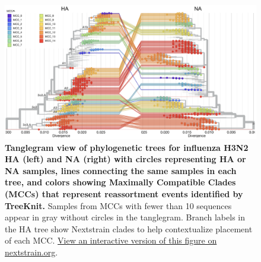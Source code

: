 \begin{figure}[!h]
\includegraphics[width=\columnwidth]{figures/flu-2016-2018-ha-na-tangletree-by-mcc.png}
\caption{{\bf Tanglegram view of phylogenetic trees for influenza H3N2 HA (left) and NA (right) with circles representing HA or NA samples, lines connecting the same samples in each tree, and colors showing Maximally Compatible Clades (MCCs) that represent reassortment events identified by TreeKnit.}
  Samples from MCCs with fewer than 10 sequences appear in gray without circles in the tanglegram.
  Branch labels in the HA tree show Nextstrain clades to help contextualize placement of each MCC.
  \href{https://nextstrain.org/groups/blab/cartography/flu-seasonal-h3n2-ha-2016-2018-reassort:groups/blab/cartography/flu-seasonal-h3n2-na-2016-2018-reassort?f_MCC=MCC_0,MCC_1,MCC_10,MCC_11,MCC_12,MCC_13,MCC_14,MCC_2,MCC_3,MCC_4,MCC_5,MCC_6,MCC_7,MCC_8,MCC_9}{View an interactive version of this figure on nextstrain.org}.
}\label{S_Fig_ha_na_tangletree}
\end{figure}

